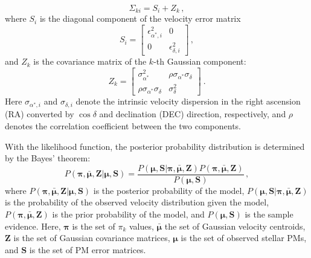 \documentclass[12pt]{ucsddissertation}
\begin{document}
\begin{CJK*}{UTF8}{gbsn}
\begin{equation}
    \Sigma_{ki} = S_i + Z_k\,,
\end{equation}
where $S_i$ is the diagonal component of the velocity error matrix
\begin{equation}
    S_i = \begin{bmatrix}
        \epsilon_{\alpha^*, i}^2 & 0 \\
        0 & \epsilon_{\delta, i}^2
    \end{bmatrix}\,,
\end{equation}
and $Z_k$ is the covariance matrix of the $k$-th Gaussian component:
\begin{equation}
    Z_k = \begin{bmatrix}
        \sigma_{\alpha^*}^2 & \rho\sigma_{\alpha^*}\sigma_\delta \\
        \rho\sigma_{\alpha^*}\sigma_\delta & \sigma_\delta^2
    \end{bmatrix}~.
\end{equation}
Here $\sigma_{\alpha^*, i}$ and $\sigma_{\delta, i}$ denote the intrinsic velocity dispersion in the right ascension (RA) converted by $\cos{\delta}$ and declination (DEC) direction, respectively, and $\rho$ denotes the correlation coefficient between the two components.

With the likelihood function, the posterior probability distribution is determined by the Bayes' theorem: 
\begin{equation}
    P\left(\boldsymbol{\pi}, \bar{\boldsymbol{\mu}}, \boldsymbol{Z}|\boldsymbol{\mu}, \boldsymbol{S}\right) = \frac{P\left(\boldsymbol{\mu}, \boldsymbol{S}|\boldsymbol{\pi}, \bar{\boldsymbol{\mu}}, \boldsymbol{Z}\right) P\left(\boldsymbol{\pi}, \bar{\boldsymbol{\mu}}, \boldsymbol{Z}\right)}{P\left(\boldsymbol{\mu}, \boldsymbol{S}\right)}\,,
\end{equation}
where $P\left(\boldsymbol{\pi}, \bar{\boldsymbol{\mu}}, \boldsymbol{Z}|\boldsymbol{\mu}, \boldsymbol{S}\right)$ is the posterior probability of the model, $P\left(\boldsymbol{\mu}, \boldsymbol{S}|\boldsymbol{\pi}, \bar{\boldsymbol{\mu}}, \boldsymbol{Z}\right)$ is the probability of the observed velocity distribution given the model, $P\left(\boldsymbol{\pi}, \bar{\boldsymbol{\mu}}, \boldsymbol{Z}\right)$ is the prior probability of the model, and $P\left(\boldsymbol{\mu}, \boldsymbol{S}\right)$ is the sample evidence. 
Here, $\boldsymbol{\pi}$ is the set of $\pi_k$ values, $\bar{\boldsymbol{\mu}}$ the set of Gaussian velocity centroids, $\boldsymbol{Z}$ is the set of Gaussian covariance matrices, $\boldsymbol{\mu}$ is the set of observed stellar PMs, and $\boldsymbol{S}$ is the set of PM error matrices. 


\end{CJK*}
\end{document}
